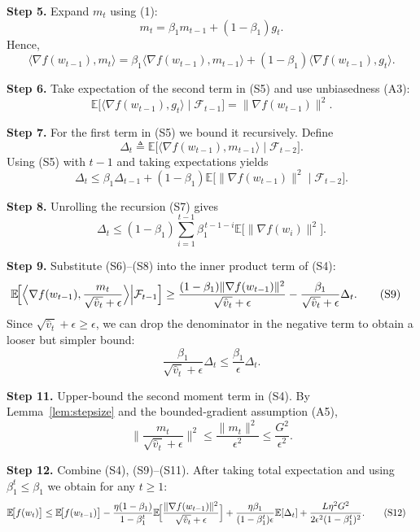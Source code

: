 \documentclass[11pt]{article}
\newcommand{\E}{\mathbb{E}}
\begin{document}
\textbf{Step 5.} Expand $m_{t}$ using (1):
\[
m_{t}= \beta_{1}m_{t-1}+(1-\beta_{1})g_{t}.
\]
Hence,
\[
\langle\nabla f(w_{t-1}),m_{t}\rangle
= \beta_{1}\langle\nabla f(w_{t-1}),m_{t-1}\rangle
+(1-\beta_{1})\langle\nabla f(w_{t-1}),g_{t}\rangle. \tag{S5}
\]

\textbf{Step 6.} Take expectation of the second term in (S5) and use
unbiasedness (A3):
\[
\E\!\bigl[\langle\nabla f(w_{t-1}),g_{t}\rangle\mid\mathcal{F}_{t-1}\bigr]
= \|\nabla f(w_{t-1})\|^{2}. \tag{S6}
\]

\textbf{Step 7.} For the first term in (S5) we bound it recursively.
Define
\[
\Delta_{t}\triangleq \E\!\bigl[\langle\nabla f(w_{t-1}),m_{t-1}\rangle\mid\mathcal{F}_{t-2}\bigr].
\]
Using (S5) with $t-1$ and taking expectations yields
\[
\Delta_{t}
\le \beta_{1}\Delta_{t-1}+(1-\beta_{1})\E\!\bigl[\|\nabla f(w_{t-1})\|^{2}\mid\mathcal{F}_{t-2}\bigr]. \tag{S7}
\]

\textbf{Step 8.} Unrolling the recursion (S7) gives
\[
\Delta_{t}\le (1-\beta_{1})\sum_{i=1}^{t-1}\beta_{1}^{\,t-1-i}
\E\!\bigl[\|\nabla f(w_{i})\|^{2}\bigr]. \tag{S8}
\]

\textbf{Step 9.} Substitute (S6)–(S8) into the inner product term of (S4):
\begin{align}
\E\!\Bigl[\Big\langle\nabla f(w_{t-1}),\frac{m_{t}}{\sqrt{\hat v_{t}}+\epsilon}\Big\rangle\Big|\mathcal{F}_{t-1}\Bigr]
&\ge
\frac{(1-\beta_{1})\|\nabla f(w_{t-1})\|^{2}}{\sqrt{\hat v_{t}}+\epsilon}
-\frac{\beta_{1}}{\sqrt{\hat v_{t}}+\epsilon}\Delta_{t}. \tag{S9}
\end{align}
Since $\sqrt{\hat v_{t}}+\epsilon\ge\epsilon$, we can drop the denominator in the
negative term to obtain a looser but simpler bound:
\[
\frac{\beta_{1}}{\sqrt{\hat v_{t}}+\epsilon}\Delta_{t}
\le \frac{\beta_{1}}{\epsilon}\Delta_{t}. \tag{S10}
\]

\textbf{Step 11.} Upper‑bound the second moment term in (S4).  By Lemma~\ref{lem:stepsize}
and the bounded‑gradient assumption (A5),
\[
\Big\|\frac{m_{t}}{\sqrt{\hat v_{t}}+\epsilon}\Big\|^{2}
\le \frac{\|m_{t}\|^{2}}{\epsilon^{2}}
\le \frac{G^{2}}{\epsilon^{2}}. \tag{S11}
\]

\textbf{Step 12.} Combine (S4), (S9)–(S11).  After taking total expectation
and using $\beta_{1}^{t}\le\beta_{1}$ we obtain for any $t\ge1$:
\begin{align}
\E\!\bigl[f(w_{t})\bigr]
&\le \E\!\bigl[f(w_{t-1})\bigr]
- \frac{\eta(1-\beta_{1})}{1-\beta_{1}^{t}}
\E\!\Bigl[\frac{\|\nabla f(w_{t-1})\|^{2}}{\sqrt{\hat v_{t}}+\epsilon}\Bigr]
+ \frac{\eta\beta_{1}}{(1-\beta_{1}^{t})\epsilon}
\E[\Delta_{t}]
+ \frac{L\eta^{2}G^{2}}{2\epsilon^{2}(1-\beta_{1}^{t})^{2}}. \tag{S12}
\end{align}
\end{document}
